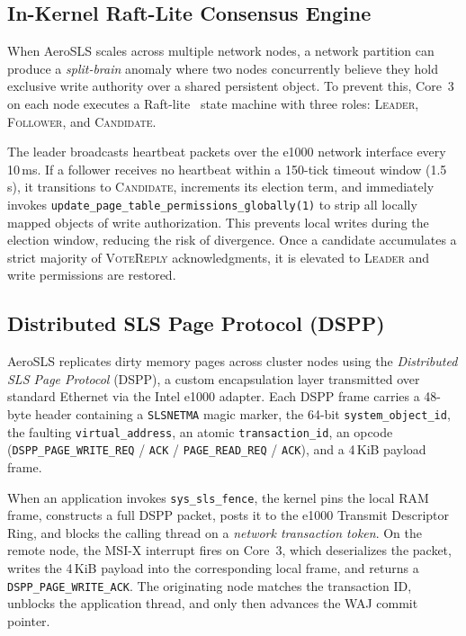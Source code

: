 \documentclass[sigconf]{acmart}
\begin{document}
\subsection{In-Kernel Raft-Lite Consensus Engine}
When AeroSLS scales across multiple network nodes, a network
partition can produce a \emph{split-brain} anomaly where two
nodes concurrently believe they hold exclusive write authority
over a shared persistent object.  To prevent this, Core~3 on
each node executes a Raft-lite~\cite{raft} state machine with
three roles: \textsc{Leader}, \textsc{Follower}, and
\textsc{Candidate}.

The leader broadcasts heartbeat packets over the e1000
network interface every 10\,ms.  If a follower receives no
heartbeat within a 150-tick timeout window (1.5\,s), it
transitions to \textsc{Candidate}, increments its election term,
and immediately invokes \texttt{update\_page\_table\_permissions\_globally(1)}
to strip all locally mapped objects of write authorization.
This prevents local writes
during the election window, reducing the risk of divergence.  Once a candidate accumulates a strict majority of
\textsc{VoteReply} acknowledgments, it is elevated to
\textsc{Leader} and write permissions are restored.

\subsection{Distributed SLS Page Protocol (DSPP)}
AeroSLS replicates dirty memory pages across cluster nodes using
the \emph{Distributed SLS Page Protocol} (DSPP), a custom
encapsulation layer transmitted over standard Ethernet via the
Intel e1000 adapter.  Each DSPP frame carries a 48-byte header
containing a \texttt{SLSNETMA} magic marker, the 64-bit
\texttt{system\_object\_id}, the faulting \texttt{virtual\_address},
an atomic \texttt{transaction\_id}, an opcode
(\texttt{DSPP\_PAGE\_WRITE\_REQ} / \texttt{ACK} /
\texttt{PAGE\_READ\_REQ} / \texttt{ACK}), and a 4\,KiB payload
frame.

When an application invokes \texttt{sys\_sls\_fence}, the kernel
pins the local RAM frame, constructs a full DSPP packet, posts
it to the e1000 Transmit Descriptor Ring, and blocks the calling
thread on a \emph{network transaction token}.  On the remote
node, the MSI-X interrupt fires on Core~3, which deserializes
the packet, writes the 4\,KiB payload into the corresponding
local frame, and returns a \texttt{DSPP\_PAGE\_WRITE\_ACK}.  The
originating node matches the transaction ID, unblocks the
application thread, and only then advances the WAJ commit
pointer.
\end{document}
